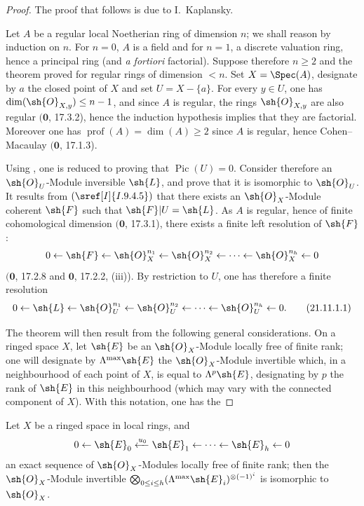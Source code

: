 \begin{proof}
The proof that follows is due to I.~Kaplansky.

Let $A$ be a regular local Noetherian ring of dimension $n$;
we shall reason by induction on $n$.
For $n=0$, $A$ is a field and for $n=1$, a discrete valuation ring, hence a principal ring (and \emph{a fortiori} factorial).
Suppose therefore $n\geq 2$ and the theorem proved for regular rings of dimension $<n$.
Set $X=\Spec(A)$, designate by $a$ the closed point of $X$ and set $U=X-\{a\}$.
For every $y\in U$, one has $\dim(\sh{O}_{X,y})\leq n-1$, and since $A$ is regular, the rings $\sh{O}_{X,y}$ are also regular $(\mathbf{0}$, 17.3.2), hence the induction hypothesis implies that they are factorial.
Moreover one has $\operatorname{prof}(A)=\dim(A)\geq 2$ since $A$ is regular, hence Cohen--Macaulay $(\mathbf{0}$, 17.1.3).


Using , one is reduced to proving that $\operatorname{Pic}(U)=0$.
Consider therefore an $\sh{O}_U$-Module inversible $\sh{L}$, and prove that it is isomorphic to $\sh{O}_U$.
It results from $(\sref[I]{I.9.4.5})$ that there exists an $\sh{O}_X$-Module coherent $\sh{F}$ such that $\sh{F}|U=\sh{L}$.
As $A$ is regular, hence of finite cohomological dimension $(\mathbf{0}$, 17.3.1), there exists a finite left resolution of $\sh{F}$:
\[
  0\leftarrow\sh{F}\leftarrow\sh{O}_X^{n_1}\leftarrow\sh{O}_X^{n_2}\leftarrow\cdots\leftarrow\sh{O}_X^{n_h}\leftarrow 0
\]
$(\mathbf{0}$, 17.2.8 and $\mathbf{0}$, 17.2.2, (iii)).
By restriction to $U$, one has therefore a finite resolution
\[
\label{IV.21.11.1.1}
  0\leftarrow\sh{L}\leftarrow\sh{O}_U^{n_1}\leftarrow\sh{O}_U^{n_2}\leftarrow\cdots\leftarrow\sh{O}_U^{n_h}\leftarrow 0.
  \tag{21.11.1.1}
\]

The theorem will then result from the following general considerations.
On a ringed space $X$, let $\sh{E}$ be an $\sh{O}_X$-Module locally free of finite rank;
one will designate by $\Lambda^{\mathrm{max}}\sh{E}$ the $\sh{O}_X$-Module invertible which, in a neighbourhood of each point of $X$, is equal to $\Lambda^p\sh{E}$, designating by $p$ the rank of $\sh{E}$ in this neighbourhood (which may vary with the connected component of $X$).
With this notation, one has the
\end{proof}

\begin{lemma}[21.11.1.2]
\label{IV.21.11.1.2}
Let $X$ be a ringed space in local rings, and
\[
  0\leftarrow\sh{E}_0\xleftarrow{u_0}\sh{E}_1\leftarrow\cdots\leftarrow\sh{E}_h\leftarrow 0
\]
an exact sequence of $\sh{O}_X$-Modules locally free of finite rank;
then the $\sh{O}_X$-Module invertible $\bigotimes_{0\leq i\leq h}(\Lambda^{\mathrm{max}}\sh{E}_i)^{\otimes(-1)^i}$ is isomorphic to $\sh{O}_X$.
\end{lemma}

